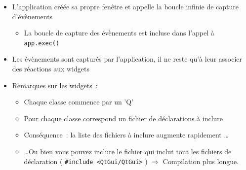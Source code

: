 \documentclass{beamer} %
\begin{document}
\begin{frame}[fragile]
	\begin{exampleblock}{}
	\begin{itemize}
		\item L'application créée sa propre fenêtre et appelle la boucle infinie de capture d'évènements
		\begin{itemize}
		\item<2-> La boucle de capture des évènements est incluse dans l'appel à \texttt{app.exec()}
		\end{itemize}
	\item<3-> Les évènements sont capturés par l'application, il ne reste qu'à leur associer des réactions aux widgets
	\item<4-> Remarques sur les widgets~:
		\begin{itemize}
		\item<5-> Chaque classe commence par un 'Q'
		\item<6-> Pour chaque classe correspond un fichier de déclarations à inclure
		\item<7-> Conséquence~: la liste des fichiers à inclure augmente rapidement \ldots
		\item<8-> \ldots  Ou bien vous pouvez inclure le fichier qui inclut tout les fichiers de déclaration ( \verb+#include <QtGui/QtGui>+ ) $ \Rightarrow $ Compilation plus longue.
		\end{itemize}
	\end{itemize}
	\end{exampleblock}
\end{frame}
\end{document}
